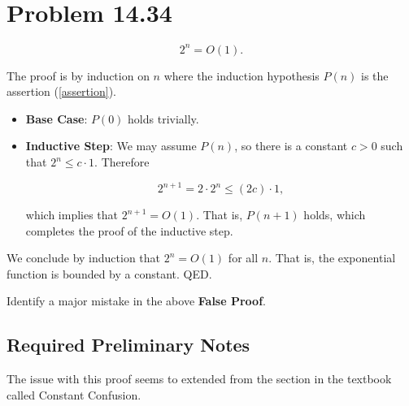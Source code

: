 \documentclass[fleqn,10pt]{olplainarticle}
\begin{document}
            
            
    \section*{Problem 14.34}
        
        \begin{falseclaim}
            \begin{equation}
                2^n = O(1). \label{assertion}
            \end{equation}
        \end{falseclaim}
        
        \begin{falseproof}
            The proof is by induction on $n$ where the induction hypothesis $P(n)$ is the assertion (\ref{assertion}).
            
            \begin{itemize}
                \item[] \textbf{Base Case}: $P(0)$ holds trivially.
                \item[] \textbf{Inductive Step}: We may assume $P(n)$, so there is a constant $c > 0$ such that $2^n \leq c \cdot 1$. Therefore 
                
                \begin{equation*}
                    2^{n+1} = 2\cdot 2^n \leq (2c) \cdot 1,
                \end{equation*}
                
                which implies that $2^{n+1} = O(1)$. That is, $P(n+1)$ holds, which completes the proof of the inductive step.
            \end{itemize}
            
            We conclude by induction that $2^n = O(1)$ for all $n$. That is, the exponential function is bounded by a constant. QED.
        \end{falseproof}
        
        Identify a major mistake in the above \textbf{False Proof}.

        \subsection*{Required Preliminary Notes}
        
            The issue with this proof seems to extended from the section in the textbook called Constant Confusion.
            
\end{document}

